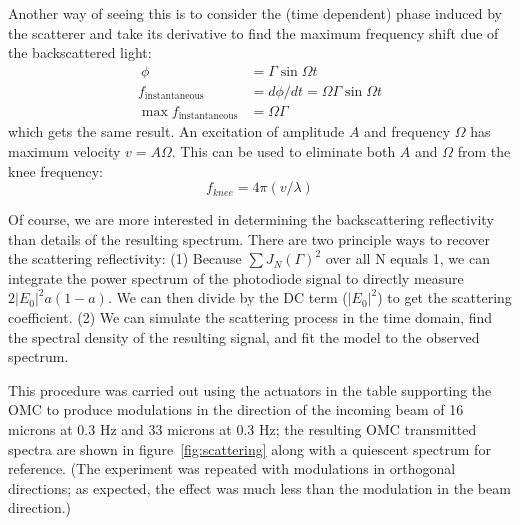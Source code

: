 Another way of seeing this is to consider the (time dependent) phase
induced by the scatterer and take its derivative to find the maximum
frequency shift due of the backscattered light:
%
\begin{align}\
\phi &= \Gamma \sin \Omega t\\
f_\text{instantaneous} &= d \phi/dt = \Omega \Gamma \sin \Omega t\\
\max f_\text{instantaneous} &= \Omega \Gamma
\end{align}
%
which gets the same result. An excitation of amplitude $A$
and frequency $\Omega$ has maximum velocity $v = A \Omega$. This can be
used to eliminate both $A$ and $\Omega$ from the knee frequency:
%
\begin{equation}
f_{knee} = 4 \pi (v / \lambda)
\end{equation}

Of course, we are more interested in determining the backscattering
reflectivity than details of the resulting spectrum.  There are two
principle ways to recover the scattering reflectivity: (1) Because
$\sum J_N(\Gamma)^2$ over all N equals 1, we can integrate the power
spectrum of the photodiode signal to directly measure $2 |E_0|^2 a (1
- a)$. We can then divide by the DC term ($|E_0|^2$) to get the
scattering coefficient.  (2) We can simulate the scattering process in 
the time domain, find the spectral density of the resulting signal,
and fit the model to the observed spectrum.

This procedure was carried out using the actuators in the table
supporting the OMC to produce modulations in the direction of the
incoming beam of 16 microns at 0.3 Hz and 33 microns at 0.3 Hz; the
resulting OMC transmitted spectra are shown in
figure~\ref{fig:scattering} along with a quiescent spectrum for
reference.  (The experiment was repeated with modulations in
orthogonal directions; as expected, the effect was much less than the
modulation in the beam direction.)

